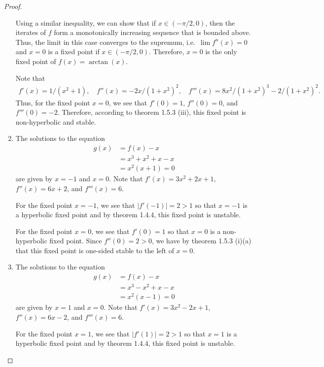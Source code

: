 \begin{proof}
\begin{enumerate}
      Using a similar inequality, we can show that if $x \in (-\pi/2, 0)$, then the iterates of $f$ form a monotonically increasing sequence that is bounded above.
      Thus, the limit in this case converges to the supremum, i.e.\ $\lim f^n(x) = 0$ and $x =0$ is a fixed point if $x \in (-\pi/2, 0)$. Therefore, $x=0$ is the only fixed point of $f(x) = \arctan(x)$.

      Note that
      \begin{align*}
        f'(x) = 1/(x^2+1), \quad f''(x) = -2 x/(1 + x^2)^2, \quad f'''(x) = 8 x^2/(1 + x^2)^3 - 2/(1 + x^2)^2.
      \end{align*}
      Thus, for the fixed point $x = 0$, we see that $f'(0) = 1$, $f''(0) = 0$, and $f'''(0) = -2$. Therefore,
      according to theorem 1.5.3 (iii), this fixed point is non-hyperbolic and stable.

    \item The solutions to the equation
      \begin{align*}
        g(x) &= f(x) - x \\
        &= x^3+x^2 + x - x \\
        &= x^2(x + 1) = 0
      \end{align*}
      are given by $x = -1$ and $x = 0$. Note that $f'(x) = 3x^2 + 2x + 1$,
      $f''(x) = 6x + 2$, and $f'''(x) = 6$.

      For the fixed point $x=-1$, we see that $|f'(-1)| = 2 > 1$ so that $x=-1$ is a hyperbolic fixed point
      and by theorem 1.4.4, this fixed point is unstable.

      For the fixed point $x=0$, we see that $f'(0) = 1$ so that $x=0$ is a non-hyperbolic fixed point.
      Since $f''(0) = 2 > 0$, we have by theorem 1.5.3 (i)(a) that this fixed point is one-sided stable to the left of $x=0$.

    \item The solutions to the equation
      \begin{align*}
        g(x) &= f(x) - x \\
        &= x^3-x^2 + x - x \\
        &= x^2(x - 1) = 0
      \end{align*}
      are given by $x = 1$ and $x = 0$. Note that $f'(x) = 3x^2 - 2x + 1$,
      $f''(x) = 6x - 2$, and $f'''(x) = 6$.

      For the fixed point $x=1$, we see that $|f'(1)| = 2 > 1$ so that $x=1$ is a hyperbolic fixed point
      and by theorem 1.4.4, this fixed point is unstable.


\end{enumerate}
\end{proof}
